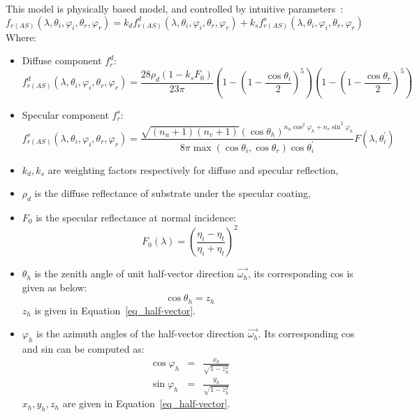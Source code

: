 This model is physically based model, and controlled by intuitive parameters~\cite{2000_Ashikhmin}:
\begin{equation}
    \label{eq_Ashikhmin_Shirley}
    f_{r(AS)}(\lambda, \theta_i, \varphi_i, \theta_r, \varphi_r) = k_d f_{r(AS)}^{d}(\lambda, \theta_i, \varphi_i, \theta_r, \varphi_r) + k_s f_{r(AS)}^{s}(\lambda, \theta_i, \varphi_i, \theta_r, \varphi_r)
\end{equation}
Where:
\begin{itemize}
    \item Diffuse component $f_r^{d}$:
          \[
              f_{r(AS)}^{d}(\lambda, \theta_i, \varphi_i, \theta_r, \varphi_r)  = \frac{28\rho_d (1 - k_s F_0)}{23\pi}%
              \left(
              1 - \left(1 - \frac{\cos\theta_i}{2}\right)^5
              \right)%
              \left(
              1 - \left(1 - \frac{\cos\theta_r}{2}\right)^5
              \right)
          \]
    \item Specular component $f_r^{s}$:
          \[
              f_{r(AS)}^{s}(\lambda, \theta_i, \varphi_i, \theta_r, \varphi_r) = \frac{\sqrt{(n_u + 1 ) (n_v + 1 )}(\cos\theta_h)^{n_u \cos^2\varphi_h + n_v \sin^2\varphi_h}}{8\pi \max(\cos\theta_i, \cos\theta_r) \cos\theta_i^\prime}%
              F(\lambda, \theta_i^\prime)
          \]
    \item $k_d, k_s$ are weighting factors respectively for diffuse and specular reflection,
    \item $\rho_d$ is the diffuse reflectance of substrate under the specular coating,

    \item $F_0$ is the specular reflectance at normal incidence:
          \[
              F_0(\lambda) = \left(\frac{\eta_i - \eta_t}{\eta_i +\eta_t}\right)^2
          \]

    \item $\theta_h$ is the zenith angle of unit half-vector direction $\overrightarrow{\omega_h}$, its corresponding cos is given as below:
          \[
              \cos \theta_h = z_h
          \]
          $z_h$ is given in Equation~\eqref{eq_half-vector}.

    \item $\varphi_h$ is the azimuth angles of the half-vector direction $\overrightarrow{\omega_h}$.
          Its corresponding cos and sin can be computed as:
          \[
              \begin{array}{lll}
                  \cos\varphi_h & = & \frac{x_h}{\sqrt{1 - z^2_h}} \\
                  \sin\varphi_h & = & \frac{y_h}{\sqrt{1 - z^2_h}}
              \end{array}
          \]
          $x_h, y_h, z_h$ are given in Equation~\eqref{eq_half-vector}.


\end{itemize}
